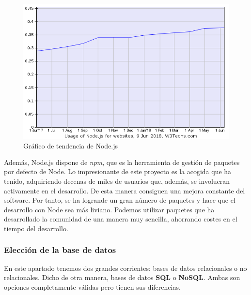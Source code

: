 \begin{figure}[H]
	\centering
	\includegraphics[scale=0.65]{imagenes/nodejs-trend.png}
	\caption{Gráfico de tendencia de Node.js \cite{nodejs-trend} \label{fig:figura4}}
\end{figure}

Además, Node.js dispone de \textit{npm}, que es la herramienta de gestión de paquetes por defecto de Node. Lo impresionante
de este proyecto es la acogida que ha tenido, adquiriendo decenas de miles de usuarios que, además, se involucran
activamente en el desarrollo. De esta manera consiguen una mejora constante del software. Por tanto, se ha logrande
un gran número de paquetes y hace que el desarrollo con Node sea más liviano. Podemos utilizar paquetes que 
ha desarrollado la comunidad de una manera muy sencilla, ahorrando costes en el tiempo del desarrollo.





\subsubsection{Elección de la base de datos}

En este apartado tenemos dos grandes corrientes: bases de datos relacionales o no relacionales. Dicho de otra manera,
bases de datos \textbf{SQL} o \textbf{NoSQL}. Ambas son opciones completamente válidas pero tienen sus diferencias.\\

